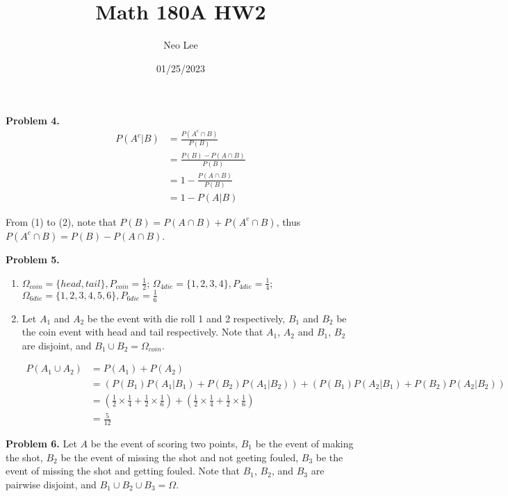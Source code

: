 \documentclass{article}
\title{Math 180A HW2}
\author{Neo Lee}
\date{01/25/2023}
\begin{document}
 

\maketitle 

\textbf{Problem 4.}
\begin{align}
    P(A^c | B) & = \frac{P(A^c \cap B)}{P(B)} \\
    & = \frac{P(B) - P(A \cap B)}{P(B)} \\ 
    & = 1 - \frac{P(A \cap B)}{P(B)} \\
    & = 1 - P(A | B) 
\end{align}

From (1) to (2), note that $P(B) = P(A \cap B) + P(A^c \cap B)$, thus $P(A^c \cap B) = P(B) - P(A \cap B)$.
\bigbreak

\textbf{Problem 5.}
\begin{enumerate}[label={(\alph*)}]
    \item  
    $\Omega_{coin} = \{head, tail\}, P_{coin} = \frac{1}{2}$;
    $\Omega_{4die} = \{1, 2, 3, 4\}, P_{4die} = \frac{1}{4}$;
    $\Omega_{6die} = \{1, 2, 3, 4, 5, 6\}, P_{6die} = \frac{1}{6}$

    \item Let $A_1$ and $A_2$ be the event with die roll 1 and 2 respectively, $B_1$ and $B_2$ be the coin event with head and tail respectively. 
    Note that $A_1$, $A_2$ and $B_1$, $B_2$ are disjoint, and $B_1 \cup B_2 = \Omega_{coin}$.

    \begin{align}
        P(A_1 \cup A_2) & = P(A_1) + P(A_2) \\
        & = (P(B_1)P(A_1 | B_1) + P(B_2)P(A_1 | B_2)) + (P(B_1)P(A_2 | B_1) + P(B_2)P(A_2 | B_2)) \\ 
        & = (\frac{1}{2} \times \frac{1}{4} + \frac{1}{2} \times \frac{1}{6}) + (\frac{1}{2} \times \frac{1}{4} + \frac{1}{2} \times \frac{1}{6}) \\ 
        & = \frac{5}{12}
    \end{align}
\end{enumerate}
\bigbreak

\textbf{Problem 6.} 
Let $A$ be the event of scoring two points, $B_1$ be the event of making the shot, $B_2$ be the event of missing the shot and not geeting fouled, $B_3$ be the event of missing the shot and getting fouled. 
Note that $B_1$, $B_2$, and $B_3$ are pairwise disjoint, and $B_1 \cup B_2 \cup B_3 = \Omega$.
\end{document}
